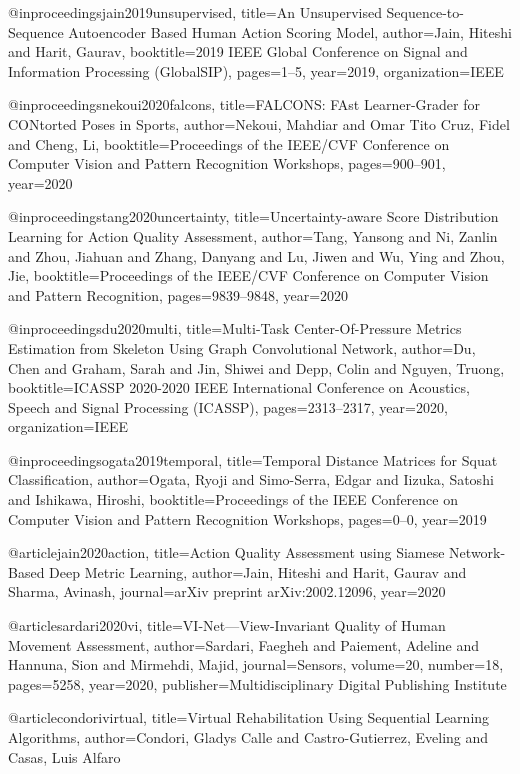 @inproceedings{jain2019unsupervised,
  title={An Unsupervised Sequence-to-Sequence Autoencoder Based Human Action Scoring Model},
  author={Jain, Hiteshi and Harit, Gaurav},
  booktitle={2019 IEEE Global Conference on Signal and Information Processing (GlobalSIP)},
  pages={1--5},
  year={2019},
  organization={IEEE}
}

@inproceedings{nekoui2020falcons,
  title={FALCONS: FAst Learner-Grader for CONtorted Poses in Sports},
  author={Nekoui, Mahdiar and Omar Tito Cruz, Fidel and Cheng, Li},
  booktitle={Proceedings of the IEEE/CVF Conference on Computer Vision and Pattern Recognition Workshops},
  pages={900--901},
  year={2020}
}

@inproceedings{tang2020uncertainty,
  title={Uncertainty-aware Score Distribution Learning for Action Quality Assessment},
  author={Tang, Yansong and Ni, Zanlin and Zhou, Jiahuan and Zhang, Danyang and Lu, Jiwen and Wu, Ying and Zhou, Jie},
  booktitle={Proceedings of the IEEE/CVF Conference on Computer Vision and Pattern Recognition},
  pages={9839--9848},
  year={2020}
}

@inproceedings{du2020multi,
  title={Multi-Task Center-Of-Pressure Metrics Estimation from Skeleton Using Graph Convolutional Network},
  author={Du, Chen and Graham, Sarah and Jin, Shiwei and Depp, Colin and Nguyen, Truong},
  booktitle={ICASSP 2020-2020 IEEE International Conference on Acoustics, Speech and Signal Processing (ICASSP)},
  pages={2313--2317},
  year={2020},
  organization={IEEE}
}

@inproceedings{ogata2019temporal,
  title={Temporal Distance Matrices for Squat Classification},
  author={Ogata, Ryoji and Simo-Serra, Edgar and Iizuka, Satoshi and Ishikawa, Hiroshi},
  booktitle={Proceedings of the IEEE Conference on Computer Vision and Pattern Recognition Workshops},
  pages={0--0},
  year={2019}
}

@article{jain2020action,
  title={Action Quality Assessment using Siamese Network-Based Deep Metric Learning},
  author={Jain, Hiteshi and Harit, Gaurav and Sharma, Avinash},
  journal={arXiv preprint arXiv:2002.12096},
  year={2020}
}

@article{sardari2020vi,
  title={VI-Net—View-Invariant Quality of Human Movement Assessment},
  author={Sardari, Faegheh and Paiement, Adeline and Hannuna, Sion and Mirmehdi, Majid},
  journal={Sensors},
  volume={20},
  number={18},
  pages={5258},
  year={2020},
  publisher={Multidisciplinary Digital Publishing Institute}
}

@article{condorivirtual,
  title={Virtual Rehabilitation Using Sequential Learning Algorithms},
  author={Condori, Gladys Calle and Castro-Gutierrez, Eveling and Casas, Luis Alfaro}
}

